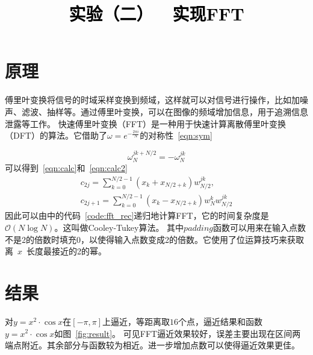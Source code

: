 \documentclass[a4paper,twoside]{article}
\newcommand{\PaperTitle}{实验（二）\ \ 实现FFT}  %
\begin{document}
\newpage

\title{
	\Large{\textcolor{black}{\PaperTitle}}
}
	
	
\maketitle
	
\tableofcontents
 
\newpage
\setcounter{page}{1}

\begin{spacing}{1.2}

\section{原理}

傅里叶变换将信号的时域采样变换到频域，这样就可以对信号进行操作，比如加噪声、滤波、抽样等。通过傅里叶变换，可以在图像的频域增加信息，用于追溯信息泄露等工作。
快速傅里叶变换（FFT）是一种用于快速计算离散傅里叶变换（DFT）的算法。它借助了$\omega=e^{-\frac{2\pi i}{N}}$的对称性~\eqref{eqn:sym}

\begin{equation}
	\label{eqn:sym}
	\omega_N^{jk+N/2}=-\omega_N^{jk}
\end{equation}
可以得到~\eqref{eqn:calc}和~\eqref{eqn:calc2}
\begin{gather}
	\label{eqn:calc}
	c_{2j}=\sum_{k=0}^{N/2-1}\left(x_k+x_{N/2+k}\right)w_{N/2}^{jk}, \\
	\label{eqn:calc2}
	c_{2j+1}=\sum_{k=0}^{N/2-1}\left(x_k-x_{N/2+k}\right)w_{N}^{k}w_{N/2}^{jk}
\end{gather}
因此可以由中的代码~\ref{code:fft_rec}递归地计算FFT，它的时间复杂度是$\mathcal{O}(N\log N)$。这叫做Cooley-Tukey算法。
其中$padding$函数可以用来在输入点数不是2的倍数时填充0，以使得输入点数变成2的倍数。它使用了位运算技巧来获取离~$x$~长度最接近的2的幂。

\section{结果}

对$y=x^2\cdot\cos x$在$[-\pi,\pi]$上逼近，等距离取$16$个点，逼近结果和函数$y=x^2\cdot\cos x$如图~\ref{fig:result}。
可见FFT逼近效果较好，误差主要出现在区间两端点附近。其余部分与函数较为相近。进一步增加点数可以使得逼近效果更佳。


\end{spacing}
\end{document}
